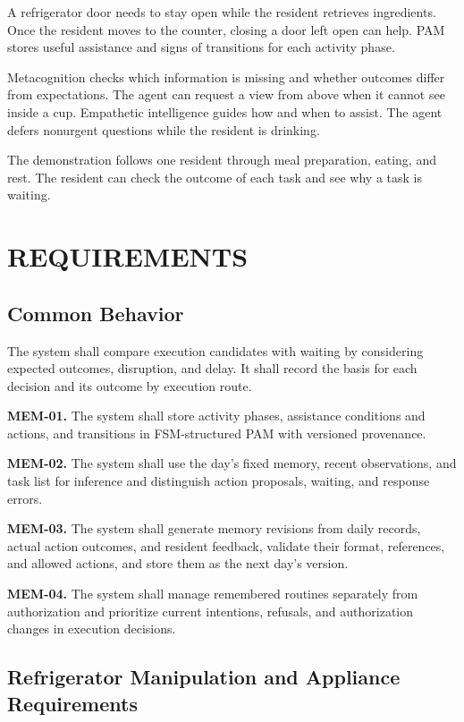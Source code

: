 \documentclass[conference,a4paper]{IEEEtran}
\newcommand{\req}[2]{\par\noindent\textbf{#1.} #2\par\smallskip}
\begin{document}
A refrigerator door needs to stay open while the resident retrieves ingredients. Once the resident moves to the counter, closing a door left open can help. PAM stores useful assistance and signs of transitions for each activity phase.

Metacognition checks which information is missing and whether outcomes differ from expectations. The agent can request a view from above when it cannot see inside a cup. Empathetic intelligence guides how and when to assist. The agent defers nonurgent questions while the resident is drinking.

The demonstration follows one resident through meal preparation, eating, and rest. The resident can check the outcome of each task and see why a task is waiting.

\section{REQUIREMENTS}

\subsection{Common Behavior}

The system shall compare execution candidates with waiting by considering expected outcomes, disruption, and delay. It shall record the basis for each decision and its outcome by execution route.

\req{MEM-01}{The system shall store activity phases, assistance conditions and actions, and transitions in FSM-structured PAM with versioned provenance.}

\req{MEM-02}{The system shall use the day's fixed memory, recent observations, and task list for inference and distinguish action proposals, waiting, and response errors.}

\req{MEM-03}{The system shall generate memory revisions from daily records, actual action outcomes, and resident feedback, validate their format, references, and allowed actions, and store them as the next day's version.}

\req{MEM-04}{The system shall manage remembered routines separately from authorization and prioritize current intentions, refusals, and authorization changes in execution decisions.}

\subsection{Refrigerator Manipulation and Appliance Requirements}
\end{document}
